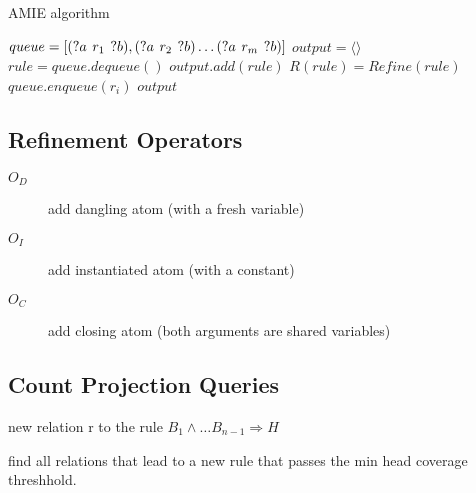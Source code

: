 
\begin{algorithm}
\caption{AMIE algorithm}
\scriptsize
\begin{algorithmic}[1]
\State $queue = [(?a\hspace{0.4em}r_{1}\hspace{0.4em}?b), (?a\hspace{0.4em}r_{2}\hspace{0.4em}?b) \ldots (?a\hspace{0.4em}r_{m}\hspace{0.4em}?b)]$
\State $output = \langle \rangle$
\State $rule = queue.dequeue()$
\State $output.add(rule)$
\EndIf
{}
\State $R(rule) = Refine(rule)$
\EndIf
{}
\State $queue.enqueue(r_{i})$
\EndIf
\EndFor
\EndWhile
\State \Return $output$
\EndProcedure
\end{algorithmic}
\end{algorithm}


\subsection{Refinement Operators}


\begin{description}
    \item[$O_{D}$] add dangling atom (with a fresh variable)
    \item[$O_{I}$] add instantiated atom (with a constant)
    \item[$O_{C}$] add closing atom (both arguments are shared variables)
\end{description}

\subsection{Count Projection Queries}

new relation r to the rule $B_{1} \land \ldots B_{n-1} \Rightarrow H$


find all relations that lead to a new rule that passes the min head coverage threshhold.

